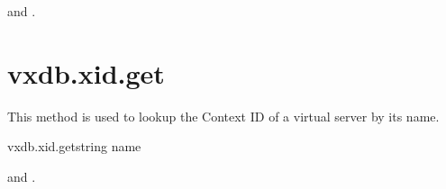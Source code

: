 \begin{rpcaccess}
 and \rpcownerchecks.
\end{rpcaccess}

\rpcreturnnil

\rpcnoerrors


\section{vxdb.xid.get}

This method is used to lookup the Context ID of a virtual server by its name.

\begin{rpcsynopsis}{vxdb.xid.get}{string name}
\end{rpcsynopsis}

\begin{rpcaccess}
 and \rpcnoownerchecks.
\end{rpcaccess}


\rpcnoerrors
